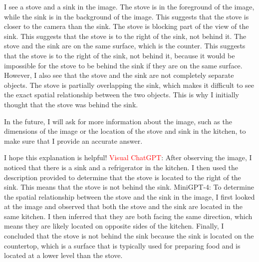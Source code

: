 \begin{enumerate}
    I see a stove and a sink in the image.
    The stove is in the foreground of the image, while the sink is in the background of the image. This suggests that the stove is closer to the camera than the sink.
    The stove is blocking part of the view of the sink. This suggests that the stove is to the right of the sink, not behind it.
    The stove and the sink are on the same surface, which is the counter. This suggests that the stove is to the right of the sink, not behind it, because it would be impossible for the stove to be behind the sink if they are on the same surface.
    However, I also see that the stove and the sink are not completely separate objects. The stove is partially overlapping the sink, which makes it difficult to see the exact spatial relationship between the two objects. This is why I initially thought that the stove was behind the sink.
    
    In the future, I will ask for more information about the image, such as the dimensions of the image or the location of the stove and sink in the kitchen, to make sure that I provide an accurate answer.
    
    I hope this explanation is helpful!
    \subitem \textcolor{red}{Visual ChatGPT}: After observing the image, I noticed that there is a sink and a refrigerator in the kitchen. I then used the description provided to determine that the stove is located to the right of the sink. This means that the stove is not behind the sink.
    \subitem MiniGPT-4: To determine the spatial relationship between the stove and the sink in the image, I first looked at the image and observed that both the stove and the sink are located in the same kitchen. I then inferred that they are both facing the same direction, which means they are likely located on opposite sides of the kitchen. Finally, I concluded that the stove is not behind the sink because the sink is located on the countertop, which is a surface that is typically used for preparing food and is located at a lower level than the stove.
\end{enumerate}
